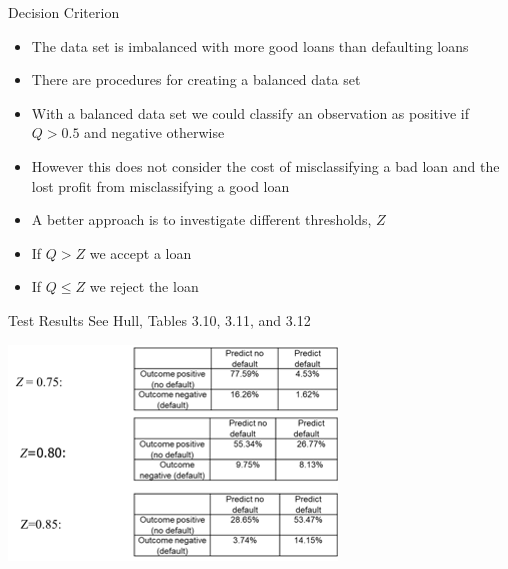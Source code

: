 \documentclass[11pt]{beamer}
\begin{document}
\begin{frame}{Decision Criterion}
	\begin{itemize}
		\item The data set is imbalanced with more good loans than defaulting loans
		\item There are procedures for creating a balanced data set
		\item With a balanced data set we could classify an observation as positive if $Q>0.5$ and negative otherwise
		\item However this does not consider the cost of misclassifying a bad loan and the lost profit from misclassifying a good loan
		\item A better approach is to investigate different thresholds, $Z$
		\item If $Q>Z$ we accept a loan
		\item If $Q\le Z$ we reject the loan
	\end{itemize}
\end{frame}
\begin{frame}{Test Results}
	See Hull, Tables 3.10, 3.11, and 3.12 
	\begin{center}
	\includegraphics[scale=1]{../05-pictures/lesson-3-1_pic_12.png}
	\end{center}
\end{frame}
\end{document}
